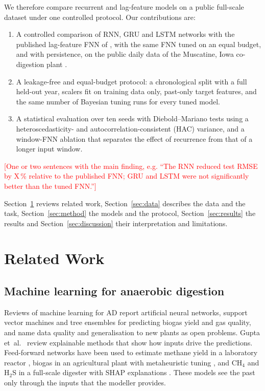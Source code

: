 \documentclass[conference]{IEEEtran}
\newcommand{\tbd}[1]{\textcolor{red}{[#1]}}
\begin{document}
We therefore compare recurrent and lag-feature models on a public full-scale dataset under one
controlled protocol. Our contributions are:
\begin{enumerate}
\item A controlled comparison of RNN, GRU and LSTM networks with the published lag-feature FNN
of \cite{long2026}, with the same FNN tuned on an equal budget, and with persistence, on the
public daily data of the Muscatine, Iowa co-digestion plant \cite{schroer2024,muscatinedata}.
\item A leakage-free and equal-budget protocol: a chronological split with a full held-out
year, scalers fit on training data only, past-only target features, and the same number of
Bayesian tuning runs for every tuned model.
\item A statistical evaluation over ten seeds with Diebold--Mariano tests using a
heteroscedasticity- and autocorrelation-consistent (HAC) variance, and a window-FNN ablation
that separates the effect of recurrence from that of a longer input window.
\end{enumerate}
\tbd{One or two sentences with the main finding, e.g. ``The RNN reduced test RMSE by X\,\%
relative to the published FNN; GRU and LSTM were not significantly better than the tuned
FNN.''}

Section~\ref{sec:related} reviews related work, Section~\ref{sec:data} describes the data and
the task, Section~\ref{sec:method} the models and the protocol, Section~\ref{sec:results}
the results and Section~\ref{sec:discussion} their interpretation and limitations.

\section{Related Work}\label{sec:related}

\subsection{Machine learning for anaerobic digestion}
Reviews of machine learning for AD \cite{cruz2022,ling2024,rutland2023} report artificial
neural networks, support vector machines and tree ensembles for predicting biogas yield and gas
quality, and name data quality and generalisation to new plants as open problems. Gupta
et~al.~\cite{gupta2023} review explainable methods that show how inputs drive the predictions.
Feed-forward networks have been used to estimate methane yield in a laboratory reactor
\cite{nair2016}, biogas in an agricultural plant with metaheuristic tuning
\cite{beltramo2019}, and CH$_4$ and H$_2$S in a full-scale digester with SHAP explanations
\cite{gavabari2026}. These models see the past only through the inputs that the modeller
provides.
\end{document}
